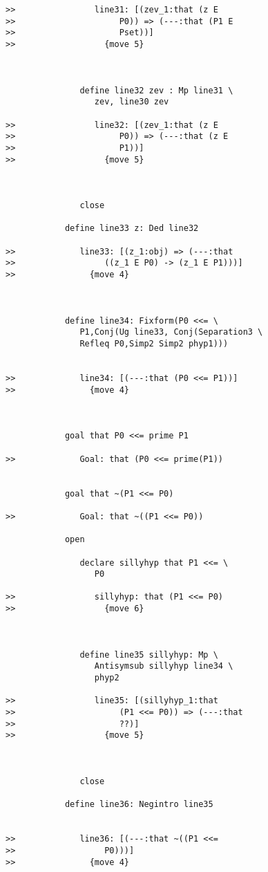 \documentclass[12pt]{article}
\begin{document}
\begin{verbatim}
>>                line31: [(zev_1:that (z E
>>                     P0)) => (---:that (P1 E
>>                     Pset))]
>>                  {move 5}



               define line32 zev : Mp line31 \
                  zev, line30 zev

>>                line32: [(zev_1:that (z E
>>                     P0)) => (---:that (z E
>>                     P1))]
>>                  {move 5}



               close

            define line33 z: Ded line32

>>             line33: [(z_1:obj) => (---:that
>>                  ((z_1 E P0) -> (z_1 E P1)))]
>>               {move 4}



            define line34: Fixform(P0 <<= \
               P1,Conj(Ug line33, Conj(Separation3 \
               Refleq P0,Simp2 Simp2 phyp1)))


>>             line34: [(---:that (P0 <<= P1))]
>>               {move 4}



            goal that P0 <<= prime P1

>>             Goal: that (P0 <<= prime(P1))


            goal that ~(P1 <<= P0)

>>             Goal: that ~((P1 <<= P0))

            open

               declare sillyhyp that P1 <<= \
                  P0

>>                sillyhyp: that (P1 <<= P0)
>>                  {move 6}



               define line35 sillyhyp: Mp \
                  Antisymsub sillyhyp line34 \
                  phyp2

>>                line35: [(sillyhyp_1:that
>>                     (P1 <<= P0)) => (---:that
>>                     ??)]
>>                  {move 5}



               close

            define line36: Negintro line35


>>             line36: [(---:that ~((P1 <<=
>>                  P0)))]
>>               {move 4}




\end{verbatim}
\end{document}

